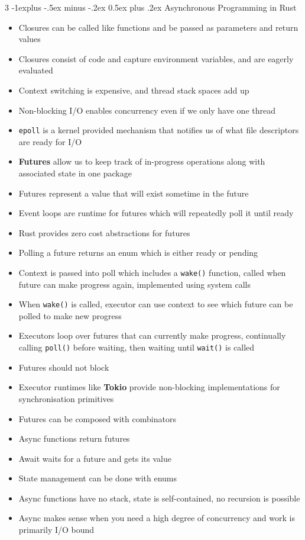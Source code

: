\documentclass[10pt, landscape]{article}
\makeatletter
\renewcommand{\section}{\@startsection{section}{1}{0mm}%
                                {-1ex plus -.5ex minus -.2ex}%
                                {0.5ex plus .2ex}%
                                {\normalfont\large\bfseries}}
\renewcommand{\section}{\@startsection{section}{2}{0mm}%
                                {-1explus -.5ex minus -.2ex}%
                                {0.5ex plus .2ex}%
                                {\normalfont\normalsize\bfseries}}
\makeatother
\begin{document}
\begin{multicols*}{3}
\section{Asynchronous Programming in Rust}
\begin{itemize}
    \item Closures can be called like functions and be passed as parameters and return values
    \item Closures consist of code and capture environment variables, and are eagerly evaluated
    \item Context switching is expensive, and thread stack spaces add up
    \item Non-blocking I/O enables concurrency even if we only have one thread
    \item \texttt{epoll} is a kernel provided mechanism that notifies us of what file descriptors are ready for I/O
    \item \textbf{Futures} allow us to keep track of in-progress operations along with associated state in one package
    \item Futures represent a value that will exist sometime in the future
    \item Event loops are runtime for futures which will repeatedly poll it until ready
    \item Rust provides zero cost abstractions for futures
    \item Polling a future returns an enum which is either ready or pending
    \item Context is passed into poll which includes a \texttt{wake()} function, called when future can make progress again, implemented using system calls
    \item When \texttt{wake()} is called, executor can use context to see which future can be polled to make new progress
    \item Executors loop over futures that can currently make progress, continually calling \texttt{poll()} before waiting, then waiting until \texttt{wait()} is called
    \item Futures should not block
    \item Executor runtimes like \textbf{Tokio} provide non-blocking implementations for synchronisation primitives
    \item Futures can be composed with combinators
    \item Async functions return futures
    \item Await waits for a future and gets its value
    \item State management can be done with enums
    \item Async functions have no stack, state is self-contained, no recursion is possible
    \item Async makes sense when you need a high degree of concurrency and work is primarily I/O bound
\end{itemize}


\end{multicols*}
\end{document}
